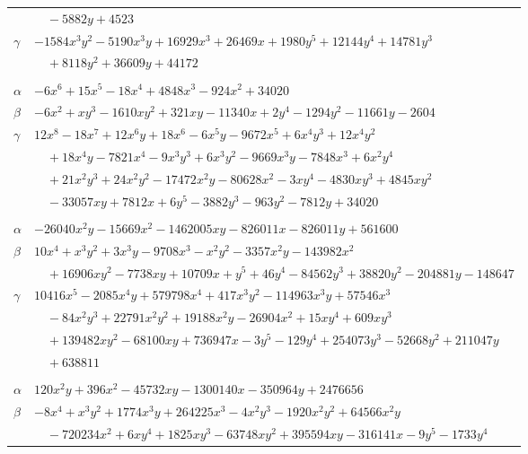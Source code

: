 \documentclass[11pt]{article}
\begin{document}
\begin{longtable}{@{}ll@{}}
 & $\quad -5882y+4523$\\
$\gamma$ & $-1584x^{3}y^{2}-5190x^{3}y+16929x^{3}+26469x+1980y^{5}+12144y^{4}+14781y^{3}$\\
 & $\quad +8118y^{2}+36609y+44172$\\
\addlinespace[3pt]
\multicolumn{2}{@{}l}{$\{i,j\}=\{18,105\}$, $k_{ij}=2^{2}\cdot 3^{6}\cdot 5\cdot 7$}\\
$\alpha$ & $-6x^{6}+15x^{5}-18x^{4}+4848x^{3}-924x^{2}+34020$\\
$\beta$ & $-6x^{2}+xy^{3}-1610xy^{2}+321xy-11340x+2y^{4}-1294y^{2}-11661y-2604$\\
$\gamma$ & $12x^{8}-18x^{7}+12x^{6}y+18x^{6}-6x^{5}y-9672x^{5}+6x^{4}y^{3}+12x^{4}y^{2}$\\
 & $\quad +18x^{4}y-7821x^{4}-9x^{3}y^{3}+6x^{3}y^{2}-9669x^{3}y-7848x^{3}+6x^{2}y^{4}$\\
 & $\quad +21x^{2}y^{3}+24x^{2}y^{2}-17472x^{2}y-80628x^{2}-3xy^{4}-4830xy^{3}+4845xy^{2}$\\
 & $\quad -33057xy+7812x+6y^{5}-3882y^{3}-963y^{2}-7812y+34020$\\
\addlinespace[3pt]
\multicolumn{2}{@{}l}{$\{i,j\}=\{18,144\}$, $k_{ij}=2^{6}\cdot 3^{4}\cdot 5^{2}\cdot 13$}\\
$\alpha$ & $-26040x^{2}y-15669x^{2}-1462005xy-826011x-826011y+561600$\\
$\beta$ & $10x^{4}+x^{3}y^{2}+3x^{3}y-9708x^{3}-x^{2}y^{2}-3357x^{2}y-143982x^{2}$\\
 & $\quad +16906xy^{2}-7738xy+10709x+y^{5}+46y^{4}-84562y^{3}+38820y^{2}-204881y-148647$\\
$\gamma$ & $10416x^{5}-2085x^{4}y+579798x^{4}+417x^{3}y^{2}-114963x^{3}y+57546x^{3}$\\
 & $\quad -84x^{2}y^{3}+22791x^{2}y^{2}+19188x^{2}y-26904x^{2}+15xy^{4}+609xy^{3}$\\
 & $\quad +139482xy^{2}-68100xy+736947x-3y^{5}-129y^{4}+254073y^{3}-52668y^{2}+211047y$\\
 & $\quad +638811$\\
\addlinespace[3pt]
\multicolumn{2}{@{}l}{$\{i,j\}=\{18,146\}$, $k_{ij}=2^{4}\cdot 3^{6}\cdot 7^{2}\cdot 13$}\\
$\alpha$ & $120x^{2}y+396x^{2}-45732xy-1300140x-350964y+2476656$\\
$\beta$ & $-8x^{4}+x^{3}y^{2}+1774x^{3}y+264225x^{3}-4x^{2}y^{3}-1920x^{2}y^{2}+64566x^{2}y$\\
 & $\quad -720234x^{2}+6xy^{4}+1825xy^{3}-63748xy^{2}+395594xy-316141x-9y^{5}-1733y^{4}$\\

\end{longtable}
\end{document}
